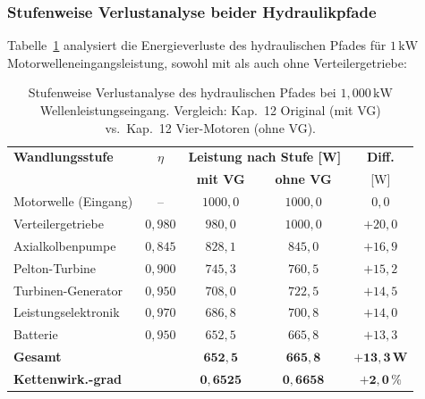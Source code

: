 ﻿\documentclass[a4paper,12pt]{article}
\begin{document}
\subsubsection{Stufenweise Verlustanalyse beider Hydraulikpfade}

Tabelle~\ref{tab:verlust_vergleich_VG} analysiert die Energieverluste
des hydraulischen Pfades für $1\,\text{kW}$ Motorwelleneingangsleistung,
sowohl mit als auch ohne Verteilergetriebe:

\begin{table}
  \centering
  \caption{Stufenweise Verlustanalyse des hydraulischen Pfades
           bei $1{,}000\,\text{kW}$ Wellenleistungseingang.
           Vergleich: Kap.~12 Original (mit VG) vs.\
           Kap.~12 Vier-Motoren (ohne VG).}
  \label{tab:verlust_vergleich_VG}
  \begin{tabular}{lcccc}
    \toprule
    \textbf{Wandlungsstufe} &
    $\eta$ &
    \multicolumn{2}{c}{\textbf{Leistung nach Stufe [W]}} &
    \textbf{Diff.} \\
    & & \textbf{mit VG} & \textbf{ohne VG} & [W] \\
    \midrule
    Motorwelle (Eingang)   & --    & $1000{,}0$ & $1000{,}0$ & $0{,}0$ \\
    Verteilergetriebe      & $0{,}980$ & $980{,}0$  & $1000{,}0$ & $+20{,}0$ \\
    Axialkolbenpumpe       & $0{,}845$ & $828{,}1$  & $845{,}0$  & $+16{,}9$ \\
    Pelton-Turbine         & $0{,}900$ & $745{,}3$  & $760{,}5$  & $+15{,}2$ \\
    Turbinen-Generator     & $0{,}950$ & $708{,}0$  & $722{,}5$  & $+14{,}5$ \\
    Leistungselektronik    & $0{,}970$ & $686{,}8$  & $700{,}8$  & $+14{,}0$ \\
    Batterie               & $0{,}950$ & $652{,}5$  & $665{,}8$  & $+13{,}3$ \\
    \midrule
    \textbf{Gesamt}        & & $\mathbf{652{,}5}$ & $\mathbf{665{,}8}$ &
    $\mathbf{+13{,}3\,\text{W}}$ \\
    \textbf{Kettenwirk.-grad} & & $\mathbf{0{,}6525}$ & $\mathbf{0{,}6658}$ &
    $\mathbf{+2{,}0\,\%}$ \\
    \bottomrule
  \end{tabular}
\end{table}
\end{document}
